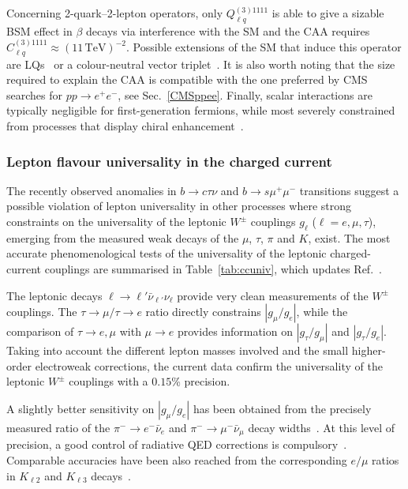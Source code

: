 \documentclass[10pt]{article}
\begin{document}
Concerning 2-quark--2-lepton operators, only \(Q_{\ell q}^{(3)1111}\) is able to give a sizable BSM effect in \(\beta\) decays via interference with the SM and the CAA requires \(C_{\ell q}^{(3)1111}\approx (11\,\text{TeV})^{-2}\). Possible extensions of the SM that induce this operator are LQs~\cite{Crivellin:2021tmz,Crivellin:2021bkd} or a colour-neutral vector triplet~\cite{Capdevila:2020rrl}. It is also worth noting that the size required to explain the CAA is compatible with the one preferred by CMS searches for $pp\to e^+e^-$, see Sec.~\ref{CMSppee}. Finally, scalar interactions are typically negligible for first-generation fermions, while most severely constrained from processes that display chiral enhancement~\cite{Bryman:2011zz,PiENu:2015seu,Hoferichter:2021lct,KTeV:2006pwx}. 


\subsubsection{Lepton flavour universality in the charged current}
%
The recently observed anomalies in $b\to c\tau\nu$ and $b\to s\mu^+\mu^-$ transitions suggest a possible violation of lepton universality in other processes where strong constraints on the universality of the leptonic $W^\pm$ couplings $g_\ell$ ($\ell = e, \mu, \tau$), emerging from the measured weak decays of the $\mu$, $\tau$, $\pi$ and $K$, exist. The most accurate phenomenological tests of the universality of the leptonic charged-current couplings are summarised in Table~\ref{tab:ccuniv}, which updates Ref.~\cite{Pich:2013lsa}.

The leptonic decays $\ell\to\ell'\bar\nu_{\ell'}\nu_\ell$ provide very clean measurements of the $W^\pm$ couplings. The $\tau\to\mu/\tau\to e$ ratio directly constrains $|g_\mu/g_e|$, while the comparison of $\tau\to e,\mu$ with $\mu\to e$ provides information on $|g_\tau/g_\mu|$ and $|g_\tau/g_e|$. 
Taking into account the different lepton masses involved and the small higher-order electroweak corrections, the current data confirm the universality of the leptonic $W^\pm$ couplings with a $0.15$\% precision.

A slightly better sensitivity on $|g_\mu/g_e|$ has been obtained from the precisely measured ratio of the $\pi^-\to e^-\bar\nu_e$ and $\pi^-\to \mu^-\bar\nu_\mu$ decay widths~\cite{Zyla:2020zbs}. At this level of precision, a good control of radiative QED corrections is compulsory~\cite{Cirigliano:2007ga,Cirigliano:2007xi}. Comparable accuracies have been also reached from the corresponding $e/\mu$ ratios in $K_{\ell 2}$ and $K_{\ell 3}$ decays~\cite{Cirigliano:2011ny}.
\end{document}
